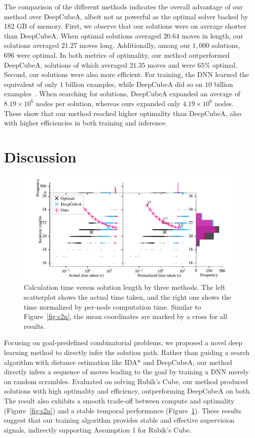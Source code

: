 \documentclass[nohyperref]{article}
\theoremstyle{plain}
\theoremstyle{definition}
\theoremstyle{remark}
\begin{document}
The comparison of the different methods indicates the overall advantage of our method over DeepCubeA, albeit not as powerful as the optimal solver backed by 182 GB of memory.
First, we observe that our solutions were on average shorter than DeepCubeA.
When optimal solutions averaged $20.64$ moves in length, our solutions averaged $21.27$ moves long.
Additionally, among our $1,000$ solutions, $696$ were optimal.
In both metrics of optimality, our method outperformed DeepCubeA, solutions of which averaged $21.35$ moves and were $65\%$ optimal.
Second, our solutions were also more efficient.
For training, the DNN learned the equivalent of only $1$ billion examples, while DeepCubeA did so on $10$ billion examples~\citep{agostinelli2019solving}.
When searching for solutions, DeepCubeA expanded an average of $8.19\times10^6$ nodes per solution, whereas ours expanded only $4.19\times10^6$ nodes.
These show that our method reached higher optimality than DeepCubeA, also with higher efficiencies in both training and inference.



\section{Discussion}
\begin{figure}[t]
    \centering
    \includegraphics[width=1.0\textwidth]{figures/results.solutions_times.pdf}
    \caption{
        Calculation time versus solution length by three methods.
        The left scatterplot shows the actual time taken, and the right one shows the time normalized by per-node computation time.
        Similar to Figure~\ref{fig:s2n}, the mean coordinates are marked by a cross for all results.
    }
    \label{fig:t2s}
\end{figure}

Focusing on goal-predefined combinatorial problems, we proposed a novel deep learning method to directly infer the solution path.
Rather than guiding a search algorithm with distance estimation like IDA* and DeepCubeA, our method directly infers a sequence of moves leading to the goal by training a DNN merely on random scrambles.
Evaluated on solving Rubik's Cube, our method produced solutions with high optimality and efficiency, outperforming DeepCubeA on both.
The result also exhibits a smooth trade-off between compute and optimality (Figure~\ref{fig:s2n}) and a stable temporal performance (Figure~\ref{fig:t2s}).
These results suggest that our training algorithm provides stable and effective supervision signals, indirectly supporting Assumption 1 for Rubik's Cube.
\end{document}
